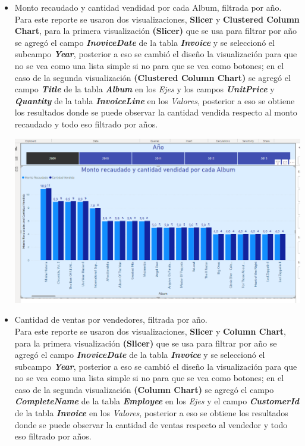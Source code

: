 \documentclass[12pt,letterpaper]{article}
\newcommand\tab[1][1cm]{\hspace*{#1}}
\begin{document}
\begin{enumerate}[\tab 1.]
\begin{itemize}
\begin{center}
            \end{center}
            \item Monto recaudado y cantidad vendidad por cada Album, filtrada por año.\\[0.1in]
            Para este reporte se usaron dos visualizaciones, \textbf{Slicer} y \textbf{Clustered Column Chart}, para la primera visualización \textbf{(Slicer)} que se usa para filtrar por año se agregó el campo \textit{\textbf{InoviceDate}} de la tabla \textit{\textbf{Invoice}} y se seleccionó el subcampo \textit{\textbf{Year}}, posterior a eso se cambió el diseño la visualización para que no se vea como una lista simple si no para que se vea como botones; en el caso de la segunda visualización \textbf{(Clustered Column Chart)} se agregó el campo \textit{\textbf{Title}} de la tabla \textit{\textbf{Album}} en los \textit{Ejes} y los campos \textit{\textbf{UnitPrice}} y \textit{\textbf{Quantity}} de la tabla \textit{\textbf{InvoiceLine}} en los \textit{Valores}, posterior a eso se obtiene los resultados donde se puede observar la cantidad vendida respecto al monto recaudado y todo eso filtrado por años.
            \begin{center}
                \includegraphics[width=13cm]{./img/img23.3.png}
            \end{center}
            \item Cantidad de ventas por vendedores, filtrada por año.\\[0.1in]
            Para este reporte se usaron dos visualizaciones, \textbf{Slicer} y \textbf{Column Chart}, para la primera visualización \textbf{(Slicer)} que se usa para filtrar por año se agregó el campo \textit{\textbf{InoviceDate}} de la tabla \textit{\textbf{Invoice}} y se seleccionó el subcampo \textit{\textbf{Year}}, posterior a eso se cambió el diseño la visualización para que no se vea como una lista simple si no para que se vea como botones; en el caso de la segunda visualización \textbf{(Column Chart)} se agregó el campo \textit{\textbf{CompleteName}} de la tabla \textit{\textbf{Employee}} en los \textit{Ejes} y el campo \textit{\textbf{CustomerId}} de la tabla \textit{\textbf{Invoice}} en los \textit{Valores}, posterior a eso se obtiene los resultados donde se puede observar la cantidad de ventas respecto al vendedor y todo eso filtrado por años.

\end{itemize}
\end{enumerate}
\end{document}
